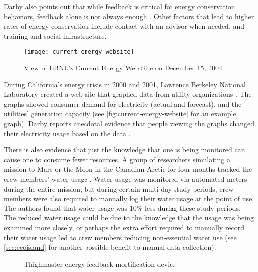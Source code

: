 Darby also points out that while feedback is critical for energy conservation behaviors, feedback alone is not always enough \cite{darby-2000-making-it-obvious}. Other factors that lead to higher rates of energy conservation include contact with an advisor when needed, and training and social infrastructure.

\begin{figure}[htbp]
	\centering
		\texttt{[image: current-energy-website]}
		\caption{View of LBNL's Current Energy Web Site on December 15, 2004}
		\label{fig:current-energy-website}
\end{figure}

During California's energy crisis in 2000 and 2001, Lawrence Berkeley National Laboratory created a web site that graphed data from utility organizations \cite{Bartholomew2008Current-Energy}. The graphs showed consumer demand for electricity (actual and forecast), and the utilities' generation capacity (see \autoref{fig:current-energy-website} for an example graph). Darby reports anecdotal evidence that people viewing the graphs changed their electricity usage based on the data \cite{darby-review-2006}.


There is also evidence that just the knowledge that one is being monitored can cause one to consume fewer resources. A group of researchers simulating a mission to Mars or the Moon in the Canadian Arctic for four months tracked the crew members' water usage \cite{Bamsey2008FMARS}. Water usage was monitored via automated meters during the entire mission, but during certain multi-day study periods, crew members were also required to manually log their water usage at the point of use. The authors found that water usage was 10\% less during these study periods. The reduced water usage could be due to the knowledge that the usage was being examined more closely, or perhaps the extra effort required to manually record their water usage led to crew members reducing non-essential water use (see \autoref{sec:ecoisland} for another possible benefit to manual data collection).

\begin{figure}[htbp]
	\centering
		\caption{Thighmaster energy feedback mortification device}
		\label{fig:thighmaster}
\end{figure}

